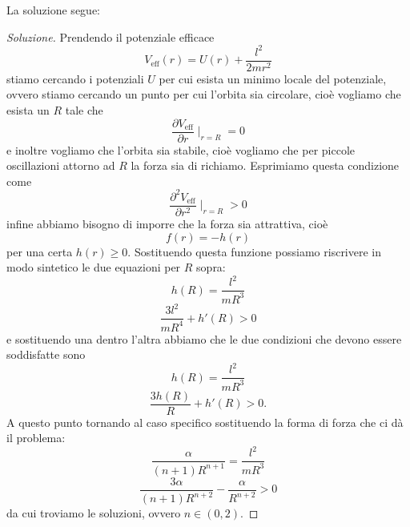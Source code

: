 \documentclass[11pt]{scrartcl}
\begin{document}
	\begin{sol}
		La soluzione segue:
		\begin{proof}[Soluzione]
			Prendendo il potenziale efficace
			$$V_\text{eff}(r)=U(r)+\frac{l^2}{2mr^2}$$
			stiamo cercando i potenziali $U$ per cui esista un minimo locale del potenziale, ovvero stiamo cercando un punto per cui l'orbita sia circolare, cioè vogliamo che esista un $R$ tale che
			$$\frac{\partial V_\text{eff}}{\partial r}	\mid_{r=R}=0$$
			e inoltre vogliamo che l'orbita sia stabile, cioè vogliamo che per piccole oscillazioni attorno ad $R$ la forza sia di richiamo. Esprimiamo questa condizione come
			$$\frac{\partial^2 V_\text{eff}}{\partial r^2}\mid_{r=R}>0$$
			infine abbiamo bisogno di imporre che la forza sia attrattiva, cioè 
			$$f(r)=-h(r)$$
			per una certa $h(r)\ge 0$. Sostituendo questa funzione possiamo riscrivere in modo sintetico le due equazioni per $R$ sopra:
			$$
			h(R)=\frac{l^2}{mR^3}
			$$
			$$
			\frac{3l^2}{mR^4}+h'(R)>0
			$$
			e sostituendo una dentro l'altra abbiamo che le due condizioni che devono essere soddisfatte sono
			$$h(R)=\frac{l^2}{mR^3}$$
			$$\frac{3 h(R)}{R}+h'(R)>0.$$
			A questo punto tornando al caso specifico sostituendo la forma di forza che ci dà il problema:
			$$\frac{\alpha}{(n+1)R^{n+1}}=\frac{l^2}{mR^3}$$
			$$\frac{3\alpha}{(n+1)R^{n+2}}-\frac{\alpha}{R^{n+2}}>0$$
			da cui troviamo le soluzioni, ovvero $n\in (0,2)$.
		\end{proof}
	\end{sol}
\end{document}
